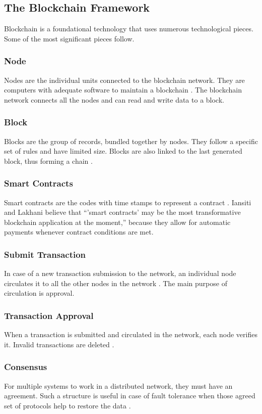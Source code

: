 \documentclass[sigconf]{acmart}
\begin{document}
\subsection{The Blockchain Framework}
Blockchain is a foundational technology that uses numerous technological pieces. Some of the most significant pieces follow.

\subsubsection{Node} Nodes are the individual units connected to the blockchain network. They are computers with adequate software to maintain a blockchain \cite{pabc1} \cite{pabc2}. The blockchain network connects all the nodes and can read and write data to a block.

\subsubsection{Block} Blocks are the group of records, bundled together by nodes. They follow a specific set of rules and have limited size. Blocks are also linked to the last generated block, thus forming a chain \cite{pabc1}.

\subsubsection{Smart Contracts} Smart contracts are the codes with time stamps to represent a contract \cite{pabc1}. Iansiti and Lakhani \cite{hbr} believe that ``'smart contracts' may be the most transformative blockchain application at the moment,'' because they allow for automatic payments whenever contract conditions are met. 

\subsubsection{Submit Transaction} In case of a new transaction submission to the network, an individual node circulates it to all the other nodes in the network \cite{pabc1}. The main purpose of circulation is approval. 

\subsubsection{Transaction Approval} When a transaction is submitted and circulated in the network, each node verifies it. Invalid transactions are deleted \cite{pabc1}.

\subsubsection{Consensus} For multiple systems to work in a distributed network, they must have an agreement. Such a structure is useful in case of fault tolerance when those agreed set of protocols help to restore the data \cite{pabc1}.
\end{document}
